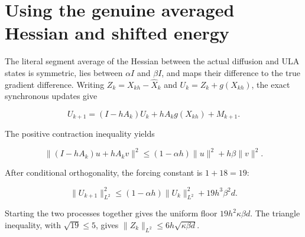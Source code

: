 \documentclass[11pt,a4paper]{article}
\begin{document}
\section{\texorpdfstring{Using the genuine averaged Hessian and shifted energy}{Using the genuine averaged Hessian and shifted energy}}


The literal segment average of the Hessian between the actual
    diffusion and ULA states is symmetric, lies between \(\alpha I\) and
    \(\beta I\), and maps their difference to the true gradient difference.
    Writing \(Z_k=X_{kh}-\widehat X_k\) and \(U_k=Z_k+g(X_{kh})\),
    the exact synchronous updates give


    \[U_{k+1}=(I-hA_k)U_k+hA_kg(X_{kh})+M_{k+1}.\]


The positive contraction inequality yields


    \[\|(I-hA_k)u+hA_kv\|^2
      \le(1-\alpha h)\|u\|^2+h\beta\|v\|^2.\]


After conditional orthogonality, the forcing constant is
    \(1+18=19\):


    \[\|U_{k+1}\|_{L^2}^2
      \le(1-\alpha h)\|U_k\|_{L^2}^2+19h^3\beta^2d.\]


Starting the two processes together gives the uniform floor
    \(19h^2\kappa\beta d\). The triangle inequality, with
    \(\sqrt{19}\le5\), gives
    \(\|Z_k\|_{L^2}\le6h\sqrt{\kappa\beta d}\).
\end{document}
